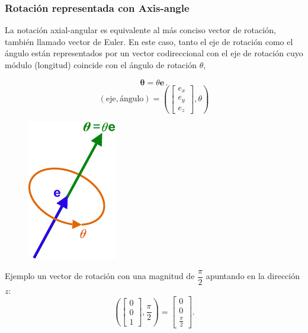\begin{frame}
    \frametitle{Rotación representada con Axis-angle}
    La notación axial-angular es equivalente al más conciso vector de rotación, también llamado vector de Euler. En este caso, tanto el eje de rotación como el ángulo están representados por un vector codireccional con el eje de rotación cuyo módulo (longitud) coincide con el ángulo de rotación $\theta$,
    \begin{center}
        \begin{minipage}{0.38\linewidth}
            \small
            \begin{equation*}
                {\displaystyle {\boldsymbol {\theta }}=\theta \mathbf {e} \,.}
            \end{equation*}
            \begin{equation*}
                {\displaystyle (\mathrm {eje} ,\mathrm {\text{ángulo}} )=\left({\begin{bmatrix}e_{x}\\e_{y}\\e_{z}\end{bmatrix}},\theta \right)}
            \end{equation*}
        \end{minipage}
        \hspace{1em}
        \begin{minipage}{0.38\linewidth}
            \centering
            \begin{figure}
	           \includegraphics[width=0.3\columnwidth]{images/axis_angle_vector.pdf}
            \end{figure}
        \end{minipage}
    \end{center}

    Ejemplo un vector de rotación con una magnitud de $\dfrac{\pi}{2}$ apuntando en la dirección $z$:
    \begin{equation*}
        {\displaystyle {\left({\begin{bmatrix}0\\0\\1\end{bmatrix}},{\frac {\pi }{2}}\right) = \begin{bmatrix}0\\0\\{\frac {\pi }{2}}\end{bmatrix}}.}
    \end{equation*}


\end{frame}

